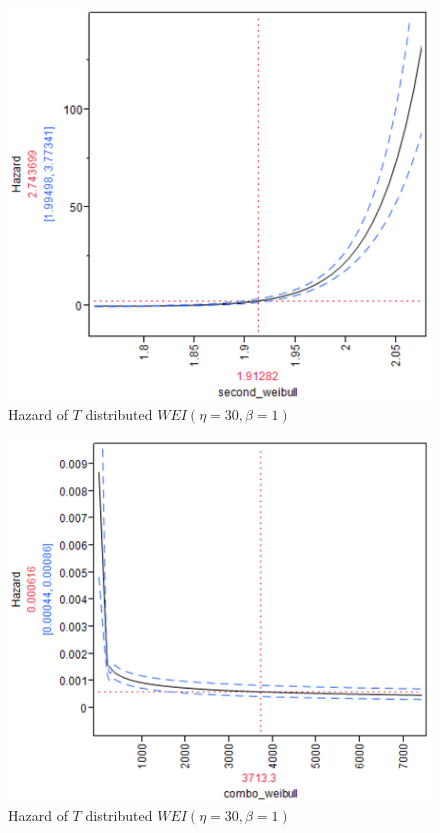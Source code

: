 \documentclass{article}
\begin{document}
\begin{enumerate}
\begin{enumerate}
\begin{enumerate}
   \begin{center}
        \FloatBarrier
      \begin{figure}
        \centering
        \includegraphics[width = 5in]{prob4d_weibull_2_haz.png}
        \caption{Hazard of \(T \) distributed \( WEI(\eta = 30 , \beta = 1)\)}
      \end{figure}
      \FloatBarrier
  \end{center}
  
   \begin{center}
        \FloatBarrier
      \begin{figure}
        \centering
        \includegraphics[width = 5in]{prob4d_weibull_combo_haz.png}
        \caption{Hazard of \(T \) distributed \( WEI(\eta = 30 , \beta = 1)\)}
      \end{figure}
      \FloatBarrier
  \end{center} 
  

\end{enumerate}
\end{enumerate}
\end{enumerate}
\end{document}
